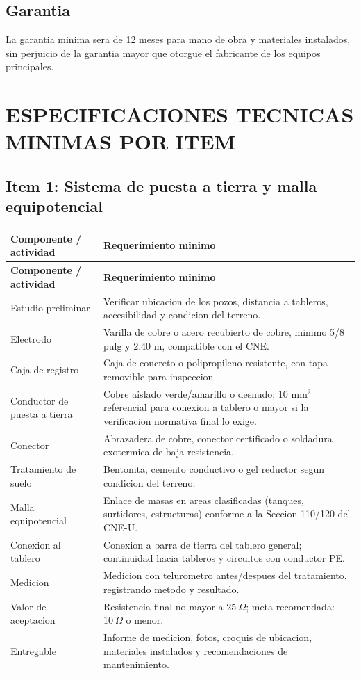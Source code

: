 \documentclass[12pt,letterpaper]{report}
\newcommand{\reqheader}{\rowcolor{azulunap!14}}
\begin{document}
\subsection{Garantia}

La garantia minima sera de 12 meses para mano de obra y materiales instalados,
sin perjuicio de la garantia mayor que otorgue el fabricante de los equipos
principales.

\section{ESPECIFICACIONES TECNICAS MINIMAS POR ITEM}

\subsection{Item 1: Sistema de puesta a tierra y malla equipotencial}

\begin{longtable}{P{0.30\textwidth} P{0.62\textwidth}}
\toprule
\reqheader \textbf{Componente / actividad} & \textbf{Requerimiento minimo} \\
\midrule
\endfirsthead
\toprule
\reqheader \textbf{Componente / actividad} & \textbf{Requerimiento minimo} \\
\midrule
\endhead
Estudio preliminar & Verificar ubicacion de los pozos, distancia a tableros, accesibilidad y condicion del terreno. \\
Electrodo & Varilla de cobre o acero recubierto de cobre, minimo 5/8 pulg y 2.40 m, compatible con el CNE. \\
Caja de registro & Caja de concreto o polipropileno resistente, con tapa removible para inspeccion. \\
Conductor de puesta a tierra & Cobre aislado verde/amarillo o desnudo; 10 mm\(^2\) referencial para conexion a tablero o mayor si la verificacion normativa final lo exige. \\
Conector & Abrazadera de cobre, conector certificado o soldadura exotermica de baja resistencia. \\
Tratamiento de suelo & Bentonita, cemento conductivo o gel reductor segun condicion del terreno. \\
Malla equipotencial & Enlace de masas en areas clasificadas (tanques, surtidores, estructuras) conforme a la Seccion 110/120 del CNE-U. \\
Conexion al tablero & Conexion a barra de tierra del tablero general; continuidad hacia tableros y circuitos con conductor PE. \\
Medicion & Medicion con telurometro antes/despues del tratamiento, registrando metodo y resultado. \\
Valor de aceptacion & Resistencia final no mayor a \(25\ \Omega\); meta recomendada: \(10\ \Omega\) o menor. \\
Entregable & Informe de medicion, fotos, croquis de ubicacion, materiales instalados y recomendaciones de mantenimiento. \\
\bottomrule
\end{longtable}
\end{document}
